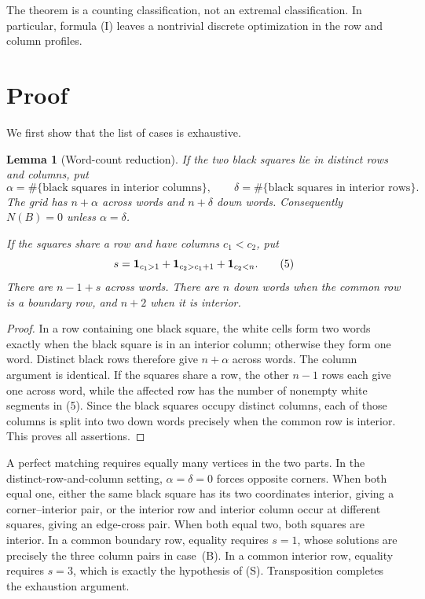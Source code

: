 \documentclass[11pt]{article}
\newtheorem{lemma}[theorem]{Lemma}
\begin{document}
The theorem is a counting classification, not an extremal classification.
In particular, formula (I) leaves a nontrivial discrete optimization in the
row and column profiles.

\section{Proof}

We first show that the list of cases is exhaustive.

\begin{lemma}[Word-count reduction]\label{lem:words}
If the two black squares lie in distinct rows and columns, put
\[
 \alpha=\#\{\text{black squares in interior columns}\},\qquad
 \delta=\#\{\text{black squares in interior rows}\}.
\]
The grid has $n+\alpha$ across words and $n+\delta$ down words.  Consequently
$N(B)=0$ unless $\alpha=\delta$.

If the squares share a row and have columns $c_1<c_2$, put
\[
s={\bf1}_{c_1>1}+{\bf1}_{c_2>c_1+1}+{\bf1}_{c_2<n}.          \tag{5}
\]
There are $n-1+s$ across words.  There are $n$ down words when the common row
is a boundary row, and $n+2$ when it is interior.
\end{lemma}

\begin{proof}
In a row containing one black square, the white cells form two words exactly
when the black square is in an interior column; otherwise they form one word.
Distinct black rows therefore give $n+\alpha$ across words.  The column
argument is identical.  If the squares share a row, the other $n-1$ rows each
give one across word, while the affected row has the number of nonempty white
segments in (5).  Since the black squares occupy distinct columns, each of
those columns is split into two down words precisely when the common row is
interior.  This proves all assertions.
\end{proof}

A perfect matching requires equally many vertices in the two parts.  In the
distinct-row-and-column setting, $\alpha=\delta=0$ forces opposite corners.
When both equal one, either the same black square has its two coordinates
interior, giving a corner--interior pair, or the interior row and interior
column occur at different squares, giving an edge-cross pair.  When both equal
two, both squares are interior.  In a common boundary row, equality requires
$s=1$, whose solutions are precisely the three column pairs in case~(B).  In
a common interior row, equality requires $s=3$, which is exactly the hypothesis
of (S).  Transposition completes the exhaustion argument.
\end{document}
